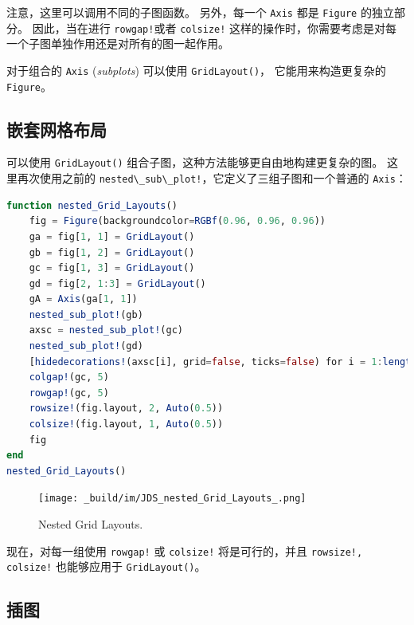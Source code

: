 \documentclass[
  notoc %
]{tufte-book}
\newcommand{\passthrough}[1]{#1}
\begin{document}
注意，这里可以调用不同的子图函数。 另外，每一个
\passthrough{\lstinline!Axis!} 都是 \passthrough{\lstinline!Figure!}
的独立部分。 因此，当在进行 \passthrough{\lstinline"rowgap!"}或者
\passthrough{\lstinline"colsize!"}
这样的操作时，你需要考虑是对每一个子图单独作用还是对所有的图一起作用。

对于组合的 \passthrough{\lstinline!Axis!} (\emph{subplots}) 可以使用
\passthrough{\lstinline!GridLayout()!}， 它能用来构造更复杂的
\passthrough{\lstinline!Figure!}。

\hypertarget{ux5d4cux5957ux7f51ux683cux5e03ux5c40}{%
\subsection{嵌套网格布局}\label{ux5d4cux5957ux7f51ux683cux5e03ux5c40}}

可以使用 \passthrough{\lstinline!GridLayout()!}
组合子图，这种方法能够更自由地构建更复杂的图。 这里再次使用之前的
\passthrough{\lstinline"nested\_sub\_plot!"}，它定义了三组子图和一个普通的
\passthrough{\lstinline!Axis!}：

\begin{lstlisting}[language=Julia]
function nested_Grid_Layouts()
    fig = Figure(backgroundcolor=RGBf(0.96, 0.96, 0.96))
    ga = fig[1, 1] = GridLayout()
    gb = fig[1, 2] = GridLayout()
    gc = fig[1, 3] = GridLayout()
    gd = fig[2, 1:3] = GridLayout()
    gA = Axis(ga[1, 1])
    nested_sub_plot!(gb)
    axsc = nested_sub_plot!(gc)
    nested_sub_plot!(gd)
    [hidedecorations!(axsc[i], grid=false, ticks=false) for i = 1:length(axsc)]
    colgap!(gc, 5)
    rowgap!(gc, 5)
    rowsize!(fig.layout, 2, Auto(0.5))
    colsize!(fig.layout, 1, Auto(0.5))
    fig
end
nested_Grid_Layouts()
\end{lstlisting}

\begin{figure}
\hypertarget{fig:nested_Grid_Layouts}{%
\centering
\texttt{[image: \_build/im/JDS\_nested\_Grid\_Layouts\_.png]}
\caption{Nested Grid Layouts.}\label{fig:nested_Grid_Layouts}
}
\end{figure}

现在，对每一组使用 \passthrough{\lstinline"rowgap!"} 或
\passthrough{\lstinline"colsize!"} 将是可行的，并且
\passthrough{\lstinline"rowsize!, colsize!"} 也能够应用于
\passthrough{\lstinline!GridLayout()!}。

\hypertarget{ux63d2ux56fe}{%
\subsection{插图}\label{ux63d2ux56fe}}
\end{document}
